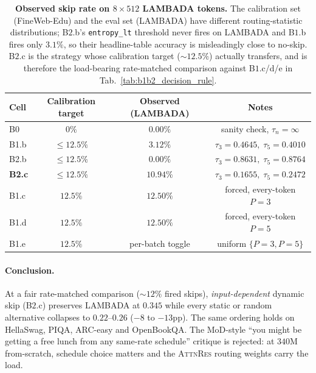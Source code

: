 \documentclass{article}
\newcommand{\attnres}{\textsc{AttnRes}}
\begin{document}
\begin{table}[h]
\caption{\textbf{Observed skip rate on $8\times512$ LAMBADA tokens.} The calibration set (FineWeb-Edu) and the eval set (LAMBADA) have different routing-statistic distributions; B$2.$b's \texttt{entropy\_lt} threshold never fires on LAMBADA and B$1.$b fires only $3.1\%$, so their headline-table accuracy is misleadingly close to no-skip. B$2.$c is the strategy whose calibration target ($\sim$$12.5\%$) actually transfers, and is therefore the load-bearing rate-matched comparison against B$1.$c/d/e in Tab.~\ref{tab:b1b2_decision_rule}.}
\label{tab:b1b2_observed_rate}
\centering\small
\begin{tabular}{lccc}
\toprule
Cell & Calibration target & Observed (LAMBADA) & Notes \\
\midrule
B0  & $0\%$        & $0.00\%$  & sanity check, $\tau_n{=}\infty$ \\
B1.b & $\le 12.5\%$ & $3.12\%$  & $\tau_3{=}0.4645,\;\tau_5{=}0.4010$ \\
B2.b & $\le 12.5\%$ & $0.00\%$  & $\tau_3{=}0.8631,\;\tau_5{=}0.8764$ \\
\textbf{B2.c} & $\le 12.5\%$ & $\mathbf{10.94\%}$ & $\tau_3{=}0.1655,\;\tau_5{=}0.2472$ \\
B1.c & $12.5\%$     & $12.50\%$ & forced, every-token $P{=}3$ \\
B1.d & $12.5\%$     & $12.50\%$ & forced, every-token $P{=}5$ \\
B1.e & $12.5\%$     & per-batch toggle & uniform $\{P{=}3, P{=}5\}$ \\
\bottomrule
\end{tabular}
\end{table}

\paragraph{Conclusion.} At a fair rate-matched comparison ($\sim$$12\%$
fired skips), \emph{input-dependent} dynamic skip (B$2.$c) preserves
LAMBADA at $0.345$ while every static or random alternative collapses
to $0.22$--$0.26$ ($-8$ to $-13$pp). The same ordering holds on
HellaSwag, PIQA, ARC-easy and OpenBookQA. The MoD-style ``you might be
getting a free lunch from any same-rate schedule'' critique is
rejected: at $340$M from-scratch, schedule choice matters and the
\attnres{} routing weights carry the load.
\end{document}
